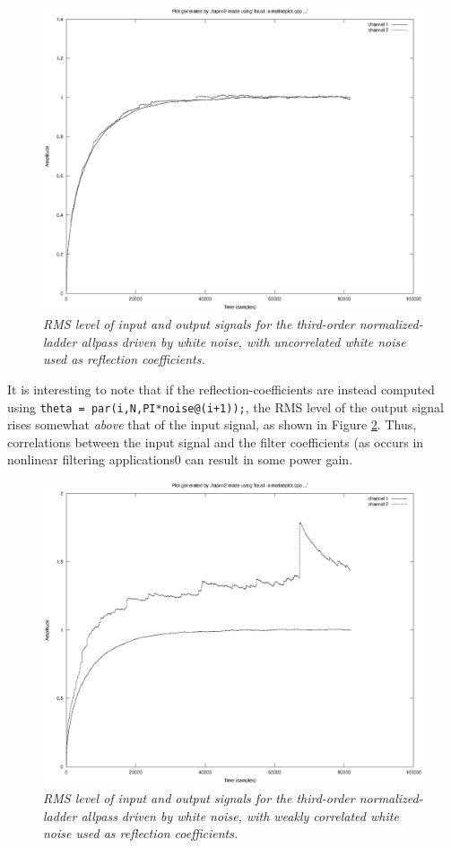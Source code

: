 \documentclass[twoside,a4paper]{article}
\begin{document}
\begin{figure}[ht]
\center
\includegraphics[width=6.5in]{eps/tapnn2.eps}
\caption{\label{tapnn2}{\it RMS level of input and output signals
for the third-order normalized-ladder allpass driven by white noise,
with uncorrelated white noise used as reflection coefficients.}}
\end{figure} 

It is interesting to note that if the reflection-coefficients are
instead computed using \verb!theta = par(i,N,PI*noise@(i+1));!, the
RMS level of the output signal rises somewhat \emph{above} that of the
input signal, as shown in Figure \ref{tapnn2tmc}.  Thus, correlations
between the input signal and the filter coefficients (as occurs in
nonlinear filtering applications0 can result in some power gain.
% 

\begin{figure}[ht]
\center
\includegraphics[width=6.5in]{eps/tapnn2tmc.eps}
\caption{\label{tapnn2tmc}{\it RMS level of input and output signals
for the third-order normalized-ladder allpass driven by white noise,
with weakly correlated white noise used as reflection coefficients.}}
\end{figure} 
\end{document}
